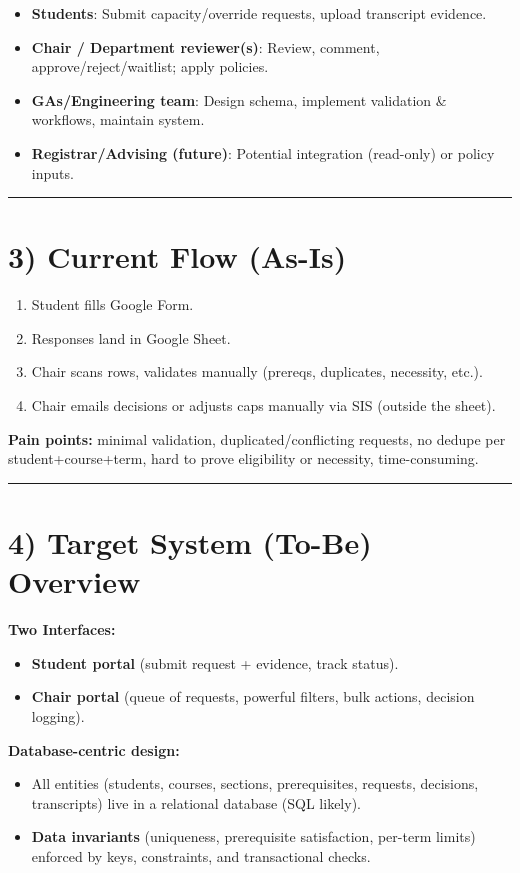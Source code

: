 \documentclass[12pt,a4paper]{article}
\begin{document}
\begin{itemize}
  \item \textbf{Students}: Submit capacity/override requests, upload transcript evidence.
  \item \textbf{Chair / Department reviewer(s)}: Review, comment, approve/reject/waitlist; apply policies.
  \item \textbf{GAs/Engineering team}: Design schema, implement validation \& workflows, maintain system.
  \item \textbf{Registrar/Advising (future)}: Potential integration (read-only) or policy inputs.
\end{itemize}

\hrule

\section*{3) Current Flow (As-Is)}

\begin{enumerate}
  \item Student fills Google Form.
  \item Responses land in Google Sheet.
  \item Chair scans rows, validates manually (prereqs, duplicates, necessity, etc.).
  \item Chair emails decisions or adjusts caps manually via SIS (outside the sheet).
\end{enumerate}

\textbf{Pain points:} minimal validation, duplicated/conflicting requests, no dedupe per student+course+term, hard to prove eligibility or necessity, time-consuming.

\hrule

\section*{4) Target System (To-Be) Overview}

\textbf{Two Interfaces:}
\begin{itemize}
  \item \textbf{Student portal} (submit request + evidence, track status).
  \item \textbf{Chair portal} (queue of requests, powerful filters, bulk actions, decision logging).
\end{itemize}

\textbf{Database-centric design:}
\begin{itemize}
  \item All entities (students, courses, sections, prerequisites, requests, decisions, transcripts) live in a relational database (SQL likely).
  \item \textbf{Data invariants} (uniqueness, prerequisite satisfaction, per-term limits) enforced by keys, constraints, and transactional checks.
\end{itemize}
\end{document}
